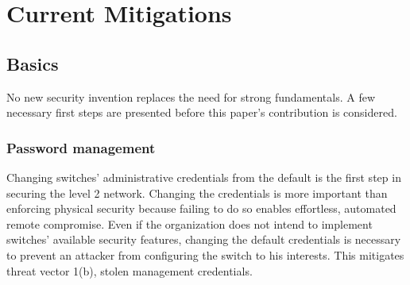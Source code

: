 \documentclass[journal]{IEEEtran}
\newcommand{\textbi}[1]{\textbf{\textit{#1}}}
\begin{document}

\section{Current Mitigations}

\subsection{Basics}
No new security invention replaces the need for strong fundamentals. A few necessary first steps
are presented before this paper's contribution is considered.

\subsubsection{Password management}
Changing switches' administrative credentials from the default is the first step in securing the
level 2 network. Changing the credentials is more important than enforcing physical security
because failing to do so enables effortless, automated remote compromise. Even if the organization
does not intend to implement switches' available security features, changing the default
credentials is necessary to prevent an attacker from configuring the switch to his interests. This
mitigates threat vector 1(b), stolen management credentials.
\end{document}
